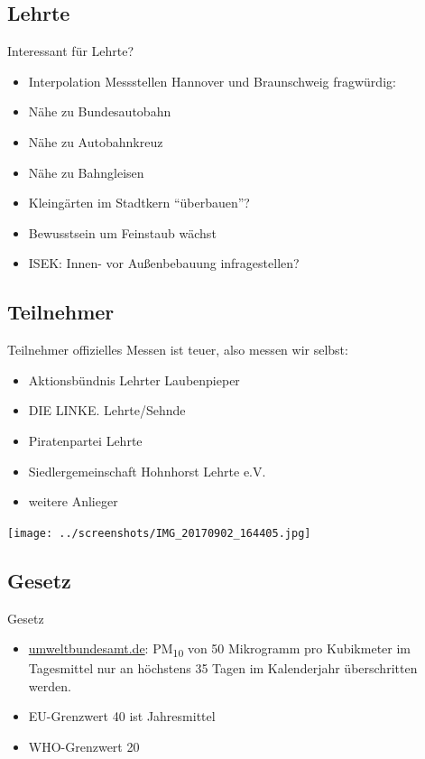 \documentclass[aspectratio=169]{beamer} %
\begin{document}
\subsection{Lehrte}
\begin{frame}{Interessant für Lehrte?}
  \begin{itemize}
  \item Interpolation Messstellen Hannover und Braunschweig fragwürdig:
  \item Nähe zu Bundesautobahn
  \item Nähe zu Autobahnkreuz
  \item Nähe zu Bahngleisen
  \item Kleingärten im Stadtkern ``überbauen''?
  \item Bewusstsein um Feinstaub wächst
  \item ISEK: Innen- vor Außenbebauung infragestellen?
  \end{itemize}
\end{frame}

\subsection{Teilnehmer}
\begin{frame}{Teilnehmer}
  offizielles Messen ist teuer, also messen wir selbst:
  \begin{itemize}
  \item Aktionsbündnis Lehrter Laubenpieper
  \item DIE LINKE. Lehrte/Sehnde
  \item Piratenpartei Lehrte
  \item Siedlergemeinschaft Hohnhorst Lehrte e.V.
  \item weitere Anlieger
  \end{itemize}
  \begin{center}
    \texttt{[image: ../screenshots/IMG\_20170902\_164405.jpg]}
  \end{center}
\end{frame}

\subsection{Gesetz}
\begin{frame}{Gesetz}
  \begin{itemize}
  \item \href{https://www.umweltbundesamt.de/daten/luft/feinstaub-belastung}{umweltbundesamt.de}:
    PM\textsubscript{10} von 50 Mikrogramm pro Kubikmeter im Tagesmittel nur an höchstens 35 Tagen im Kalenderjahr überschritten werden.
  \item EU-Grenzwert 40 ist Jahresmittel
  \item WHO-Grenzwert 20
  \end{itemize}
\end{frame}
\end{document}
